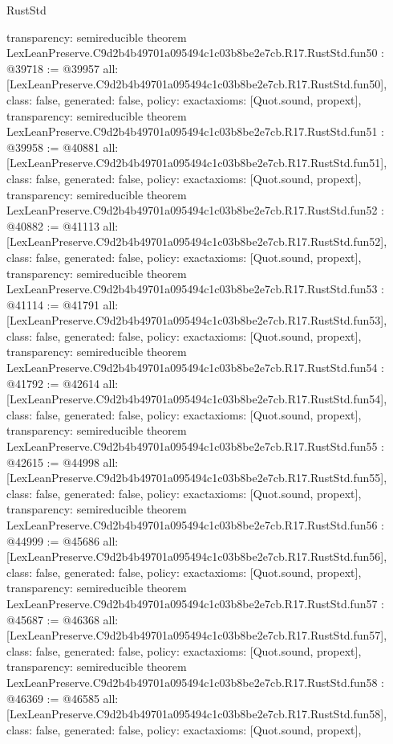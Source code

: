 \begin{lexlean}{RustStd}
\begin{coremodule}
{  transparency: semireducible
}
theorem LexLeanPreserve.C9d2b4b49701a095494c1c03b8be2e7cb.R17.RustStd.fun50 : @39718 := @39957 {
  all: [LexLeanPreserve.C9d2b4b49701a095494c1c03b8be2e7cb.R17.RustStd.fun50],
  class: false,
  generated: false,
  policy: exact{axioms: [Quot.sound, propext]},
  transparency: semireducible
}
theorem LexLeanPreserve.C9d2b4b49701a095494c1c03b8be2e7cb.R17.RustStd.fun51 : @39958 := @40881 {
  all: [LexLeanPreserve.C9d2b4b49701a095494c1c03b8be2e7cb.R17.RustStd.fun51],
  class: false,
  generated: false,
  policy: exact{axioms: [Quot.sound, propext]},
  transparency: semireducible
}
theorem LexLeanPreserve.C9d2b4b49701a095494c1c03b8be2e7cb.R17.RustStd.fun52 : @40882 := @41113 {
  all: [LexLeanPreserve.C9d2b4b49701a095494c1c03b8be2e7cb.R17.RustStd.fun52],
  class: false,
  generated: false,
  policy: exact{axioms: [Quot.sound, propext]},
  transparency: semireducible
}
theorem LexLeanPreserve.C9d2b4b49701a095494c1c03b8be2e7cb.R17.RustStd.fun53 : @41114 := @41791 {
  all: [LexLeanPreserve.C9d2b4b49701a095494c1c03b8be2e7cb.R17.RustStd.fun53],
  class: false,
  generated: false,
  policy: exact{axioms: [Quot.sound, propext]},
  transparency: semireducible
}
theorem LexLeanPreserve.C9d2b4b49701a095494c1c03b8be2e7cb.R17.RustStd.fun54 : @41792 := @42614 {
  all: [LexLeanPreserve.C9d2b4b49701a095494c1c03b8be2e7cb.R17.RustStd.fun54],
  class: false,
  generated: false,
  policy: exact{axioms: [Quot.sound, propext]},
  transparency: semireducible
}
theorem LexLeanPreserve.C9d2b4b49701a095494c1c03b8be2e7cb.R17.RustStd.fun55 : @42615 := @44998 {
  all: [LexLeanPreserve.C9d2b4b49701a095494c1c03b8be2e7cb.R17.RustStd.fun55],
  class: false,
  generated: false,
  policy: exact{axioms: [Quot.sound, propext]},
  transparency: semireducible
}
theorem LexLeanPreserve.C9d2b4b49701a095494c1c03b8be2e7cb.R17.RustStd.fun56 : @44999 := @45686 {
  all: [LexLeanPreserve.C9d2b4b49701a095494c1c03b8be2e7cb.R17.RustStd.fun56],
  class: false,
  generated: false,
  policy: exact{axioms: [Quot.sound, propext]},
  transparency: semireducible
}
theorem LexLeanPreserve.C9d2b4b49701a095494c1c03b8be2e7cb.R17.RustStd.fun57 : @45687 := @46368 {
  all: [LexLeanPreserve.C9d2b4b49701a095494c1c03b8be2e7cb.R17.RustStd.fun57],
  class: false,
  generated: false,
  policy: exact{axioms: [Quot.sound, propext]},
  transparency: semireducible
}
theorem LexLeanPreserve.C9d2b4b49701a095494c1c03b8be2e7cb.R17.RustStd.fun58 : @46369 := @46585 {
  all: [LexLeanPreserve.C9d2b4b49701a095494c1c03b8be2e7cb.R17.RustStd.fun58],
  class: false,
  generated: false,
  policy: exact{axioms: [Quot.sound, propext]},
}
\end{coremodule}
\end{lexlean}
